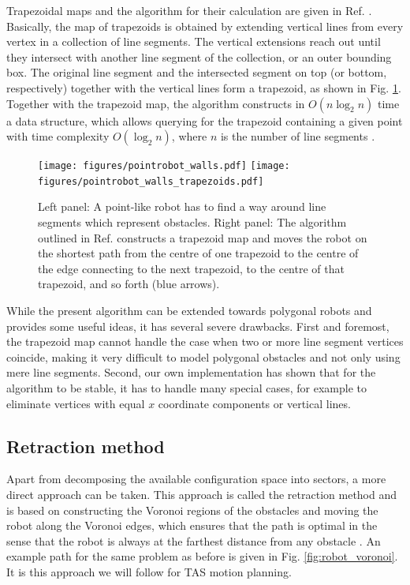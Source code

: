 Trapezoidal maps and the algorithm for their calculation are given in Ref. \cite[Ch. 6, pp. 121-146]{Berg2008}. Basically, the map of
trapezoids is obtained by extending vertical lines from every vertex in a collection of line segments. The vertical
extensions reach out until they intersect with another line segment of the collection, or an outer bounding box. The original line 
segment and the intersected segment on top (or bottom, respectively) together with the vertical lines form a trapezoid, as shown in 
Fig. \ref{fig:robot_trapezoids}. Together with the trapezoid map, the algorithm constructs in $O \left(n \log_{2} n \right)$ time a data 
structure, which allows querying for the trapezoid containing a given point with time complexity $O \left( \log_{2} n \right)$, 
where $n$ is the number of line segments \cite[Theorem 6.3, p. 133]{Berg2008}.

\begin{figure}[htb]
	\centering
	\texttt{[image: figures/pointrobot\_walls.pdf]}
	\hspace{1 cm}
	\texttt{[image: figures/pointrobot\_walls\_trapezoids.pdf]}
	\caption{Left panel: A point-like robot has to find a way around line segments which represent obstacles. Right panel: 
		The algorithm outlined in Ref. \cite[p. 289]{Berg2008} constructs a trapezoid map and moves the robot on the
		shortest path from the centre of one trapezoid to the centre of the edge connecting to the next trapezoid, to the
		centre of that trapezoid, and so forth (blue arrows).}
	\label{fig:robot_trapezoids}
\end{figure}

While the present algorithm can be extended towards polygonal robots \cite[Ch. 13.3, pp. 290-297]{Berg2008} and provides
some useful ideas, it has several severe drawbacks. First and foremost, the trapezoid map cannot handle the case when
two or more line segment vertices coincide, making it very difficult to model polygonal obstacles and not only using mere
line segments. Second, our own implementation has shown that for the algorithm to be stable, it has to handle many 
special cases, for example to eliminate vertices with equal $x$ coordinate components or vertical lines.

\vspace{0.5cm}

\subsection*{Retraction method}
Apart from decomposing the available configuration space into sectors, a more direct approach can be taken. This
approach is called the retraction method and is based on constructing the Voronoi regions of the obstacles and moving
the robot along the Voronoi edges, which ensures that the path is optimal in the sense that the robot is always at
the farthest distance from any obstacle \cite[pp. 163 and 304]{Berg2008}. An example path for the same problem as before
is given in Fig. \ref{fig:robot_voronoi}. It is this approach we will follow for TAS motion planning.

